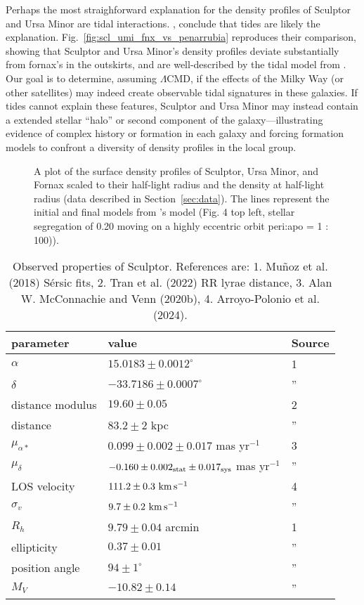 Perhaps the most straighforward explanation for the density profiles of
Sculptor and Ursa Minor are tidal interactions. \citet{sestito+2023a},
\citet{sestito+2023b} conclude that tides are likely the explanation.
Fig.~\ref{fig:scl_umi_fnx_vs_penarrubia} reproduces their comparison,
showing that Sculptor and Ursa Minor's density profiles deviate
substantially from fornax's in the outskirts, and are well-described by
the tidal model from \citet{PNM2008}. Our goal is to determine, assuming
\(\Lambda\)CMD, if the effects of the Milky Way (or other satellites)
may indeed create observable tidal signatures in these galaxies. If
tides cannot explain these features, Sculptor and Ursa Minor may instead
contain a extended stellar ``halo'' or second component of the
galaxy---illustrating evidence of complex history or formation in each
galaxy and forcing formation models to confront a diversity of density
profiles in the local group.

\begin{figure}
\centering
{}
\caption[Sculptor and Ursa Minor match tidal models]{A plot of the
surface density profiles of Sculptor, Ursa Minor, and Fornax scaled to
their half-light radius and the density at half-light radius (data
described in Section~\ref{sec:data}). The lines represent the initial
and final models from \citet{PNM2008}'s model (Fig. 4 top left, stellar
segregation of 0.20 moving on a highly eccentric orbit peri:apo = 1 :
100)).}\label{fig:scl_umi_vs_penarrubia}
\end{figure}

\begin{table*}[t]
\centering
\caption[Observed Properties of Sculptor]{Observed properties of Sculptor. References are: 1. Muñoz et al. (2018) Sérsic fits, 2. Tran et al. (2022) RR lyrae distance, 3. Alan W. McConnachie and Venn (2020b), 4. Arroyo-Polonio et al. (2024). }
\label{tbl:scl_obs_props}
\begin{tabular}{lll}
\toprule
parameter & value & Source\\
\midrule
$\alpha$ & $15.0183 \pm 0.0012^\circ$ & 1\\
$\delta$ & $-33.7186 \pm 0.0007^\circ$ & ”\\
distance modulus & $19.60 \pm 0.05$ & 2\\
distance & $83.2 \pm 2$ kpc & ”\\
$\mu_{\alpha*}$ & $0.099 \pm 0.002 \pm 0.017$ mas yr$^{-1}$ & 3\\
$\mu_\delta$ & $-0.160 \pm 0.002_{\rm stat} \pm 0.017_{\rm sys}$ mas yr$^{-1}$ & ”\\
LOS velocity & $111.2 \pm 0.3\ {\rm km\,s^{-1}}$ & 4\\
$\sigma_v$ & $9.7\pm0.2\ {\rm km\,s^{-1}}$ & ”\\
$R_h$ & $9.79 \pm 0.04$ arcmin & 1\\
ellipticity & $0.37 \pm 0.01$ & ”\\
position angle & $94\pm1^\circ$ & ”\\
$M_V$ & $-10.82\pm0.14$ & ”\\
\bottomrule
\end{tabular}
\end{table*}


